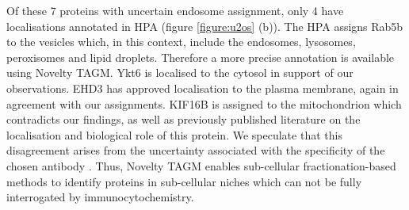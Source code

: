 \documentclass[12pt,english]{article}
\begin{document}
Of these 7 proteins with uncertain endosome assignment, only 4 have localisations annotated in HPA (figure \ref{figure:u2os} (b)). The HPA assigns Rab5b to the vesicles  which, in this context, include the endosomes, lysosomes, peroxisomes and lipid droplets. Therefore a more precise annotation is available using Novelty TAGM. Ykt6 is localised to the cytosol in support of our observations. EHD3 has approved localisation to the plasma membrane, again in agreement with our assignments. KIF16B is assigned to the mitochondrion which contradicts our findings, as well as previously published literature on the localisation and biological role of this protein. We speculate that this disagreement arises from the uncertainty associated with the specificity of the chosen antibody \citep{Thul:2017}. Thus, Novelty TAGM enables sub-cellular fractionation-based methods to identify proteins in sub-cellular niches which can not be fully interrogated by immunocytochemistry.
\end{document}
